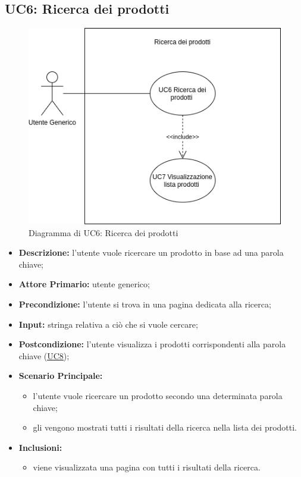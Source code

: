 \subsection{UC6: Ricerca dei prodotti}
\label{sec:UC6}
\begin{figure}[!ht]
    \caption{Diagramma di UC6: Ricerca dei prodotti}
    \vspace{10px}
    \includegraphics[scale=0.5]{../../../Images/AnalisiRequisiti/UC06}
    \centering
\end{figure}
\begin{itemize}
    \item \textbf{Descrizione:} l'utente vuole ricercare un prodotto in base ad una parola chiave;
    \item \textbf{Attore Primario:} utente generico;
    \item \textbf{Precondizione:} l'utente si trova in una pagina dedicata alla ricerca;
    \item \textbf{Input:} stringa relativa a ciò che si vuole cercare;
    \item \textbf{Postcondizione:} l'utente visualizza i prodotti corrispondenti alla parola chiave (\hyperref[sec:UC8]{\underline{UC8}});
    \item \textbf{Scenario Principale:}
          \begin{itemize}
              \item l'utente vuole ricercare un prodotto secondo una determinata parola chiave;
              \item gli vengono mostrati tutti i risultati della ricerca nella lista dei prodotti.
          \end{itemize}
    \item \textbf{Inclusioni:}
          \begin{itemize}
              \item viene visualizzata una pagina con tutti i risultati della ricerca.
          \end{itemize}
\end{itemize}
